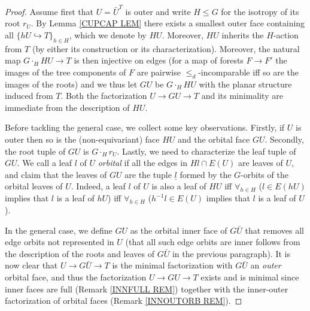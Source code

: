 \documentclass[a4paper,10pt,draft]{article}%
\begin{document}
\begin{proof}
Assume first that $U=\bar{U}^T$ is outer and write $H\leq G$ for
the isotropy of its root $r_U$.
By Lemma \ref{CUPCAP LEM} there exists a smallest outer face 
containing all $\{h U \hookrightarrow T\}_{h \in H}$,
which we denote by $HU$.
Moreover, $HU$ inherits the $H$-action from $T$ 
(by either its construction or its characterization).
Moreover, the natural map
$G \cdot_H HU \to T$
is then injective on edges
(for a map of forests $F \to F'$
the images of the tree components of $F$ are pairwise $\leq_d$-incomparable iff so are the images of the roots)
and we thus let $GU$ be $G \cdot_H HU$
with the planar structure induced from $T$.
Both the factorization $U \to GU \to T$ and its minimality are immediate from the description of $HU$.

	Before tackling the general case, we collect some key observations.
	Firstly, if $U$ is outer then so is the (non-equivariant) face $HU$ and the orbital face $GU$.
	Secondly, the root tuple of 
	$GU$ is $G\cdot_H r_U$.
	Lastly, we need to characterize the leaf tuple of $GU$. We call a leaf $l$ of $U$ \textit{orbital} if 
all the edges in $Hl \cap E(U)$ are leaves of $U$, 
	and claim that the leaves of $GU$ are the tuple $\underline{l}$ formed by the $G$-orbits of the orbital leaves of $U$. 
	Indeed, a leaf $l$ of $U$ is also a leaf of $HU$ iff 
	$\forall_{h \in H}$ ($l \in E(hU)$ implies that $l$ is a leaf of $hU$) iff
	$\forall_{h \in H}$ ($h^{-1} l \in E(U)$ implies that $l$ is a leaf of $U$).
	
	In the general case, we define $GU$ as the orbital inner face of $G \bar{U}$ that removes all edge orbits not represented in $U$ 	(that all such edge orbits are inner follows from the description of the roots and leaves of $G\bar{U}$ in the previous paragraph). 
	It is now clear that $U \to G\bar{U} \to T$ is the minimal factorization with $G\bar{U}$ an \textit{outer} orbital face,
	and thus the factorization
	$U \to GU \to T$ exists and is minimal
	since inner faces are full (Remark \ref{INNFULL REM})
	together with the inner-outer factorization of
	orbital faces (Remark \ref{INNOUTORB REM}).
\end{proof}
\end{document}
